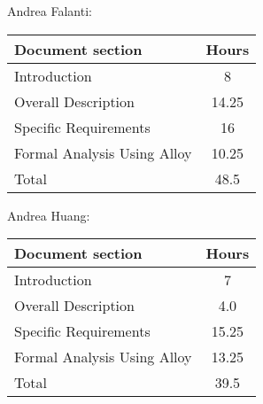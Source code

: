 Andrea Falanti:

\begin{tabular}{|l|c|}
    \hline
    Document section & Hours \\
    \hline
     Introduction & 8\\
     Overall Description & 14.25\\
     Specific Requirements & 16\\
     Formal Analysis Using Alloy & 10.25\\
     \hline
     Total & 48.5\\
     \hline
\end{tabular}
\vskip 0.3in

Andrea Huang:

\begin{tabular}{|l|c|}
    \hline
    Document section & Hours \\
    \hline
     Introduction &  7\\
     Overall Description & 4.0\\
     Specific Requirements & 15.25\\
     Formal Analysis Using Alloy & 13.25\\
     \hline
     Total & 39.5\\
     \hline
\end{tabular}